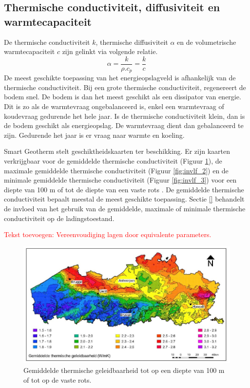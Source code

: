 \documentclass[a4paper,oneside,11pt]{report}
\numberwithin{figure}{section}
\numberwithin{table}{section}
\numberwithin{equation}{section}
\begin{document}
\subsection*{Thermische conductiviteit, diffusiviteit en warmtecapaciteit}
De thermische conductiviteit $k$, thermische diffusiviteit $\alpha$ en de volumetrische warmtecapaciteit $c$ zijn gelinkt via volgende relatie.
\begin{equation}\label{invlf_eq1}
\alpha=\dfrac{k}{\rho.c_p}=\dfrac{k}{c}
\end{equation}
De meest geschikte toepassing van het energieopslagveld is afhankelijk van de thermische conductiviteit. Bij een grote thermische conductiviteit, regenereert de bodem snel. De bodem is dan het meest geschikt als een dissipator van energie. Dit is zo als de warmtevraag ongebalanceerd is, enkel een warmtevraag of koudevraag gedurende het hele jaar. Is de thermische conductiviteit klein, dan is de bodem geschikt als energieopslag. De warmtevraag dient dan gebalanceerd te zijn. Gedurende het jaar is er vraag naar warmte en koeling.
\par Smart Geotherm stelt geschiktheidskaarten ter beschikking. Er zijn kaarten verkrijgbaar voor de gemiddelde thermische conductiviteit (Figuur \ref{fig:invlf_1}), de maximale gemiddelde thermische conductiviteit (Figuur \ref{fig:invlf_2}) en de minimale gemiddelde thermische conductiviteit (Figuur \ref{fig:invlf_3}) voor een diepte van 100 m of tot de diepte van een vaste rots \cite{}. De gemiddelde thermische conductiviteit bepaalt meestal de meest geschikte toepassing. Sectie \ref{}  behandelt de invloed van het gebruik van de gemiddelde, maximale of minimale thermische conductiviteit op de ladingstoestand. 

\textcolor{red}{Tekst toevoegen: Vereenvoudiging lagen door equivalente parameters.}

\begin{figure}[hbtp] 
	\centering
	\includegraphics[width=0.7 \textwidth]{invlf_fig1.jpg}
	\caption{Gemiddelde thermische geleidbaarheid tot op een diepte van 100 m of tot op de vaste rots.}
	\label{fig:invlf_1}
\end{figure}
\end{document}
